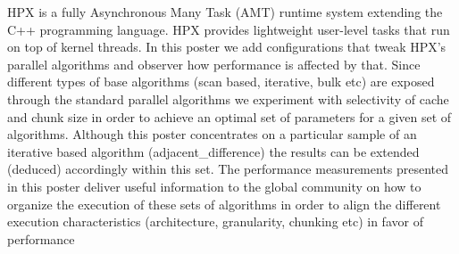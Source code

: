 HPX is a fully Asynchronous Many Task (AMT) runtime system extending the C++ programming language. HPX provides lightweight user-level tasks that run on top of kernel threads. In this poster we add configurations that tweak HPX’s parallel algorithms and observer how performance is affected by that. Since different types of base algorithms (scan based, iterative, bulk etc) are exposed through the standard parallel algorithms we experiment with selectivity of cache and chunk size in order to achieve an optimal set of parameters for a given set of algorithms. Although this poster concentrates on a particular sample of an iterative based algorithm (adjacent\_difference) the results can be extended (deduced) accordingly within this set. The performance measurements presented in this poster deliver useful information to the global community on how to organize the execution of these sets of algorithms in order to align the different execution characteristics (architecture, granularity, chunking etc) in favor of performance 